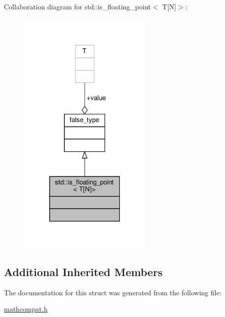 Collaboration diagram for std\+:\+:is\+\_\+floating\+\_\+point$<$ T\mbox{[}N\mbox{]}$>$\+:\nopagebreak
\begin{figure}[H]
\begin{center}
\leavevmode
\includegraphics[width=187pt]{d8/d8c/structstd_1_1is__floating__point_3_01T[N]_4__coll__graph}
\end{center}
\end{figure}
\subsection*{Additional Inherited Members}


The documentation for this struct was generated from the following file\+:\begin{DoxyCompactItemize}
\item 
\hyperlink{mathcompat_8h}{mathcompat.\+h}\end{DoxyCompactItemize}
